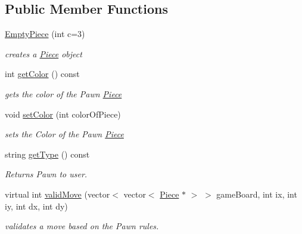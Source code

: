 \subsection*{Public Member Functions}
\begin{DoxyCompactItemize}
\item 
\hypertarget{classEmptyPiece_add461e061d61e0b8129fb2d079b1b599}{
\hyperlink{classEmptyPiece_add461e061d61e0b8129fb2d079b1b599}{EmptyPiece} (int c=3)}
\label{classEmptyPiece_add461e061d61e0b8129fb2d079b1b599}

\begin{DoxyCompactList}\small\item\em creates a \hyperlink{classPiece}{Piece} object \item\end{DoxyCompactList}\item 
int \hyperlink{classEmptyPiece_aa0ae8e05e0471cf05e17bc9f56e30188}{getColor} () const 
\begin{DoxyCompactList}\small\item\em gets the color of the Pawn \hyperlink{classPiece}{Piece} \item\end{DoxyCompactList}\item 
void \hyperlink{classEmptyPiece_ae46e7ddf6275c1508528e06929cf2660}{setColor} (int colorOfPiece)
\begin{DoxyCompactList}\small\item\em sets the Color of the Pawn \hyperlink{classPiece}{Piece} \item\end{DoxyCompactList}\item 
string \hyperlink{classEmptyPiece_ad71f9165591337d5df65c4f2500e2d36}{getType} () const 
\begin{DoxyCompactList}\small\item\em Returns Pawn to user. \item\end{DoxyCompactList}\item 
virtual int \hyperlink{classEmptyPiece_a198d7e2fd83b5564a569f580b6ccd69f}{validMove} (vector$<$ vector$<$ \hyperlink{classPiece}{Piece} $\ast$ $>$ $>$ gameBoard, int ix, int iy, int dx, int dy)
\begin{DoxyCompactList}\small\item\em validates a move based on the Pawn rules. \item\end{DoxyCompactList}\end{DoxyCompactItemize}


